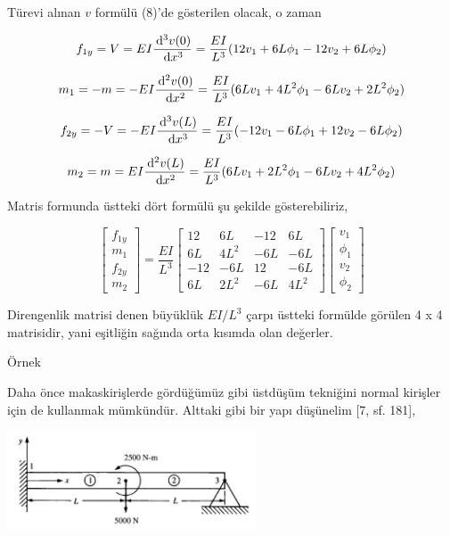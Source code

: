 \documentclass[12pt,fleqn]{article}\usepackage{../../common}
\begin{document}
Türevi alınan $v$ formülü (8)'de gösterilen olacak, o zaman

$$
f_{1y} = V = EI \frac{\,\mathrm{d}^3 v(0)}{\,\mathrm{d} x^3} =
\frac{EI}{L^3} (12 v_1 + 6L \phi_1 - 12 v_2 + 6L \phi_2 )
$$

$$
m_1 = -m = -EI \frac{\,\mathrm{d}^2 v(0)}{\,\mathrm{d} x^2} =
\frac{EI}{L^3} ( 6L v_1 + 4L^2 \phi_1 - 6L v_2 + 2 L^2 \phi_2 )
$$

$$
f_{2y} = -V = -EI \frac{\,\mathrm{d}^3 v(L)}{\,\mathrm{d} x^3} =
\frac{EI}{L^3} (-12 v_1 - 6L \phi_1 + 12 v_2 - 6L \phi_2 )
$$

$$
m_2 = m = EI \frac{\,\mathrm{d}^2 v(L)}{\,\mathrm{d} x^2} =
\frac{EI}{L^3} ( 6L v_1 + 2L^2 \phi_1 - 6L v_2 + 4 L^2 \phi_2)
$$

Matris formunda üstteki dört formülü şu şekilde gösterebiliriz,

$$
\left[\begin{array}{c}
f_{1y} \\ m_1 \\ f_{2y} \\ m_2
\end{array}\right] =
\frac{EI}{L^3}
\left[\begin{array}{cccc}
12 & 6L & -12 & 6L \\
6L & 4L^2 & -6L & -6L \\
-12 & -6L & 12 & -6L \\
6L & 2L^2 & -6L & 4L^2
\end{array}\right]
\left[\begin{array}{ccc}
v_1 \\ \phi_1 \\ v_2 \\ \phi_2
\end{array}\right]
$$

Direngenlik matrisi denen büyüklük $EI / L^3$ çarpı üstteki formülde görülen
4 x 4 matrisidir, yani eşitliğin sağında orta kısımda olan değerler.

Örnek

Daha önce makaskirişlerde gördüğümüz gibi üstdüşüm tekniğini normal kirişler
için de kullanmak mümkündür. Alttaki gibi bir yapı düşünelim [7, sf. 181],

\includegraphics[width=20em]{phy_020_strs_06_01.jpg}
\end{document}
